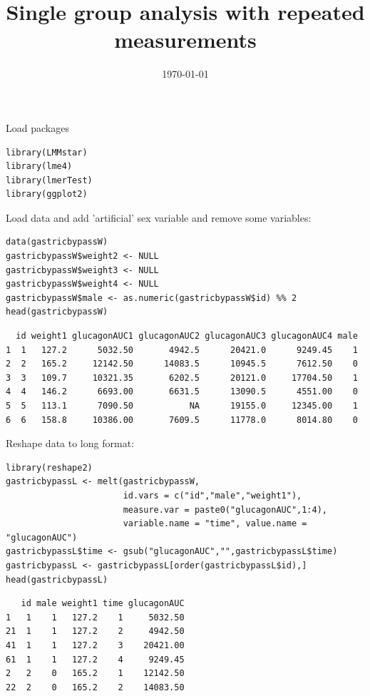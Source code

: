 \documentclass[12pt]{article}
\date{\today}
\title{Single group analysis with repeated measurements}
\begin{document}
\maketitle
Load packages
\lstset{language=r,label= ,caption= ,captionpos=b,numbers=none}
\begin{lstlisting}
library(LMMstar)
library(lme4)
library(lmerTest)
library(ggplot2)
\end{lstlisting}

Load data and add 'artificial' sex variable and remove some variables:
\lstset{language=r,label= ,caption= ,captionpos=b,numbers=none}
\begin{lstlisting}
data(gastricbypassW)
gastricbypassW$weight2 <- NULL
gastricbypassW$weight3 <- NULL
gastricbypassW$weight4 <- NULL
gastricbypassW$male <- as.numeric(gastricbypassW$id) %% 2
head(gastricbypassW)
\end{lstlisting}

\begin{verbatim}
  id weight1 glucagonAUC1 glucagonAUC2 glucagonAUC3 glucagonAUC4 male
1  1   127.2      5032.50       4942.5      20421.0      9249.45    1
2  2   165.2     12142.50      14083.5      10945.5      7612.50    0
3  3   109.7     10321.35       6202.5      20121.0     17704.50    1
4  4   146.2      6693.00       6631.5      13090.5      4551.00    0
5  5   113.1      7090.50           NA      19155.0     12345.00    1
6  6   158.8     10386.00       7609.5      11778.0      8014.80    0
\end{verbatim}


Reshape data to long format:
\lstset{language=r,label= ,caption= ,captionpos=b,numbers=none}
\begin{lstlisting}
library(reshape2)
gastricbypassL <- melt(gastricbypassW,
                       id.vars = c("id","male","weight1"),
                       measure.var = paste0("glucagonAUC",1:4),
                       variable.name = "time", value.name = "glucagonAUC")
gastricbypassL$time <- gsub("glucagonAUC","",gastricbypassL$time)
gastricbypassL <- gastricbypassL[order(gastricbypassL$id),]
head(gastricbypassL)
\end{lstlisting}

\begin{verbatim}
   id male weight1 time glucagonAUC
1   1    1   127.2    1     5032.50
21  1    1   127.2    2     4942.50
41  1    1   127.2    3    20421.00
61  1    1   127.2    4     9249.45
2   2    0   165.2    1    12142.50
22  2    0   165.2    2    14083.50
\end{verbatim}
\end{document}
